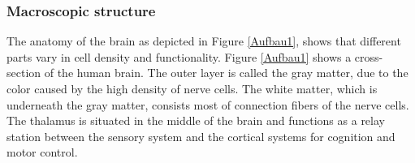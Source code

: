 \documentclass[a4paper]{article}
\begin{document}
  \subsubsection{Macroscopic structure}
  \label{sec:Macroscopicstructure}
  The anatomy of the brain as depicted in Figure \ref{Aufbau1}, shows that different parts vary in cell density and functionality.
 Figure \ref{Aufbau1} shows a cross-section of the human brain. The outer layer is called the gray matter, due to the color caused by the high density of nerve cells.
 The white matter, which is underneath the gray matter,
 consists most of connection fibers of the nerve cells.
 The thalamus is situated in the middle of the brain and functions as a relay station between the sensory system and the cortical systems for cognition and motor control.
  \begin{figure}[!htbp]
  \hfill
\end{figure}
\end{document}
